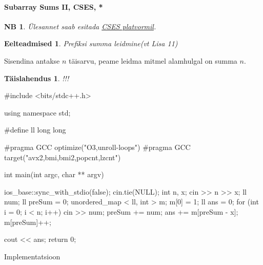 \documentclass{trkut}
\newtheorem*{prereq}{Eelteadmised}
\newtheorem*{extra}{NB}
\newtheorem*{solution}{Täislahendus}
\begin{document}
\paragraph{Subarray Sums II, CSES, *}
\begin{extra}
Ülesannet saab esitada \href{https://cses.fi/problemset/task/1661}{CSES platvormil}.
\end{extra}
\begin{prereq}
Prefiksi summa leidmine(vt Lisa 11)
\end{prereq}

Sisendina antakse $n$ täisarvu, peame leidma mitmel alamhulgal on summa $n$.
\parencite{sums}
\begin{solution}
!!!
\end{solution}


\begin{cclol}
#include <bits/stdc++.h>

using namespace std;

#define ll long long

#pragma GCC optimize("O3,unroll-loops")
#pragma GCC target("avx2,bmi,bmi2,popcnt,lzcnt")

int main(int argc, char ** argv) {
  ios_base::sync_with_stdio(false);
  cin.tie(NULL);
  int n, x;
  cin >> n >> x;
  ll num;
  ll preSum = 0;
  unordered_map < ll, int > m;
  m[0] = 1;
  ll ans = 0;
  for (int i = 0; i < n; i++) {
    cin >> num;
    preSum += num;
    ans += m[preSum - x];
    m[preSum]++;
  }

  cout << ans;
  return 0;
}
\end{cclol}
\begin{kk}[H]
\caption{Implementatsioon}%
\end{kk}
\end{document}

